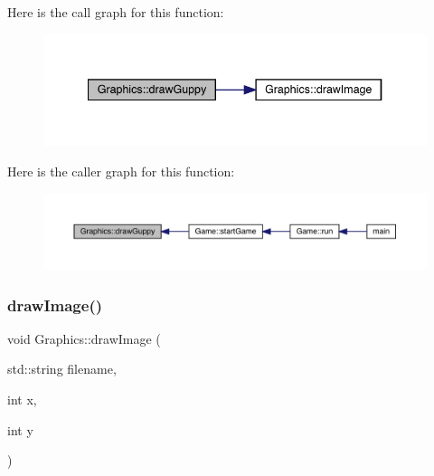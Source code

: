Here is the call graph for this function\+:\nopagebreak
\begin{figure}[H]
\begin{center}
\leavevmode
\includegraphics[width=340pt]{class_graphics_a35aa55c180a9f9be306b74906f710954_cgraph}
\end{center}
\end{figure}
Here is the caller graph for this function\+:\nopagebreak
\begin{figure}[H]
\begin{center}
\leavevmode
\includegraphics[width=350pt]{class_graphics_a35aa55c180a9f9be306b74906f710954_icgraph}
\end{center}
\end{figure}
\mbox{\label{class_graphics_afe0ce82b917ad83b8eaec222810f1efd}} 
\subsubsection{\texorpdfstring{draw\+Image()}{drawImage()}}
{\footnotesize\ttfamily void Graphics\+::draw\+Image (\begin{DoxyParamCaption}\item[{std\+::string}]{filename,  }\item[{int}]{x,  }\item[{int}]{y }\end{DoxyParamCaption})}

